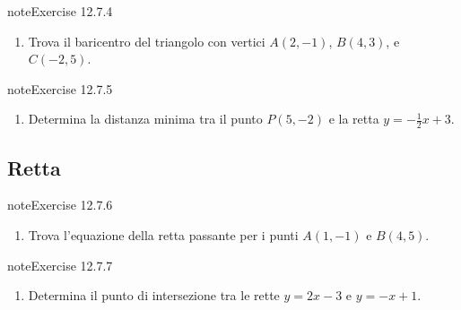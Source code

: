 \documentclass[letterpaper,10pt,italian]{jupyterBook}
\begin{document}
\begin{sphinxadmonition}{note}{Exercise 12.7.4}


\begin{enumerate}
%
\setcounter{enumi}{3}
\item {} 
\sphinxAtStartPar
Trova il baricentro del triangolo con vertici \( A(2, -1) \), \( B(4, 3) \), e \( C(-2, 5) \).

\end{enumerate}
\end{sphinxadmonition}
 \label{exercise:ch/analytic_geometry/analytic_geometry_2d/sol-exercise-4}

\begin{sphinxadmonition}{note}{Exercise 12.7.5}


\begin{enumerate}
%
\setcounter{enumi}{4}
\item {} 
\sphinxAtStartPar
Determina la distanza minima tra il punto \( P(5, -2) \) e la retta \( y = -\frac{1}{2}x + 3 \).

\end{enumerate}
\end{sphinxadmonition}


\subsection{Retta}
\label{\detokenize{ch/analytic_geometry/analytic_geometry_2d/sol:retta}} \label{exercise:ch/analytic_geometry/analytic_geometry_2d/sol-exercise-5}

\begin{sphinxadmonition}{note}{Exercise 12.7.6}


\begin{enumerate}
%
\setcounter{enumi}{5}
\item {} 
\sphinxAtStartPar
Trova l’equazione della retta passante per i punti \( A(1, -1) \) e \( B(4, 5) \).

\end{enumerate}
\end{sphinxadmonition}
 \label{exercise:ch/analytic_geometry/analytic_geometry_2d/sol-exercise-6}

\begin{sphinxadmonition}{note}{Exercise 12.7.7}


\begin{enumerate}
%
\setcounter{enumi}{6}
\item {} 
\sphinxAtStartPar
Determina il punto di intersezione tra le rette \( y = 2x - 3 \) e \( y = -x + 1 \).

\end{enumerate}
\end{sphinxadmonition}
 \label{exercise:ch/analytic_geometry/analytic_geometry_2d/sol-exercise-7}
\end{document}

